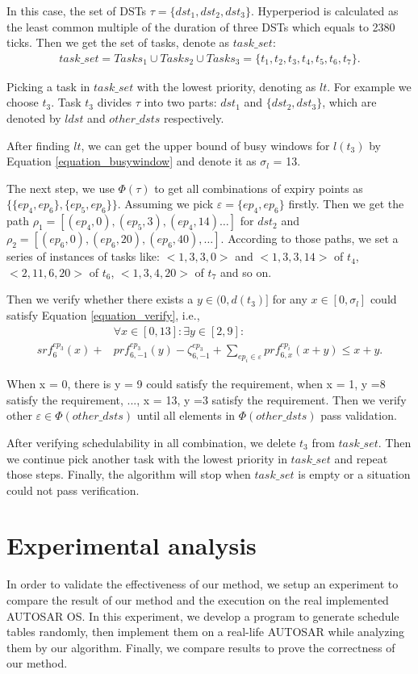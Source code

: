 \documentclass[sigconf]{acmart}
\begin{document}
In this case, the set of DSTs $\tau =\{dst_1,dst_2,dst_3\}$. Hyperperiod is calculated as the least common multiple of the duration of three DSTs which equals to 2380 ticks. Then we get the set of tasks, denote as $task\_set$: 
\[\begin{split}
task\_set=Tasks_1\cup Tasks_2\cup Tasks_3=\{t_1,t_2,t_3,t_4,t_5,t_6,t_7\}.
\end{split}\]

Picking a task in $task\_set$ with the lowest priority, denoting as $lt$. For example we choose $t_3$. Task $t_3$ divides $\tau$ into two parts: $dst_1$ and $\{dst_2,dst_3\}$, which are denoted by $ldst$ and $other\_dsts$ respectively. 

After finding $lt$, we can get the upper bound of busy windows for $l(t_3)$ by Equation \ref{equation_busywindow} and denote it as $\sigma_l$ = 13. 

The next step, we use $\Phi(\tau)$ to get all combinations of expiry points as $\{\{ep_4,ep_6\},\{ep_5,ep_6\}\}$. Assuming we pick $\varepsilon=\{ep_4,ep_6\}$ firstly. Then we get the path $\rho_1=[(ep_4,0),(ep_5,3),(ep_4,14)\dots]$ for $dst_2$ and $\rho_2=[(ep_6,0),(ep_6,20),(ep_6,40),\dots]$. According to those paths, we set a series of instances of tasks like: $<1,3,3,0>$ and $<1,3,3,14>$ of $t_4$, $<2,11,6,20>$ of $t_6$, $<1,3,4,20>$ of $t_7$ and so on.


Then we verify whether there exists a $y\in(0,d(t_3)]$ for any $x\in[0,\sigma_l]$ could satisfy Equation \ref{equation_verify}, i.e.,
\[\begin{split}
&\forall x\in[0,13]:\exists y\in[2,9]:\\
srf^{ep_3}_6(x)+&prf^{ep_3}_{6,-1}(y)-\zeta^{ep_3}_{6,-1}+\sum\limits_{ep_i\in \varepsilon}prf^{ep_i}_{6,x}(x+y)\leq x+y.
\end{split}\]


When x = 0, there is y = 9 could satisfy the requirement, when x = 1, y =8 satisfy the requirement, ..., x = 13, y =3 satisfy the requirement. Then we verify other $\varepsilon\in\Phi(other\_dsts)$ until all elements in $\Phi(other\_dsts)$ pass validation.

After verifying schedulability in all combination, we delete $t_3$ from $task\_set$. Then we continue pick another task with the lowest priority in $task\_set$ and repeat those steps. Finally, the algorithm will stop when $task\_set$ is empty or a situation could not pass verification.


\section{Experimental analysis}
In order to validate the effectiveness of our method, we setup an experiment to compare the result of our method and the execution on the real implemented AUTOSAR OS. In this experiment, we develop a program to generate schedule tables randomly, then implement them on a real-life AUTOSAR while analyzing them by our algorithm. Finally, we compare results to prove the correctness of our method.
\end{document}
